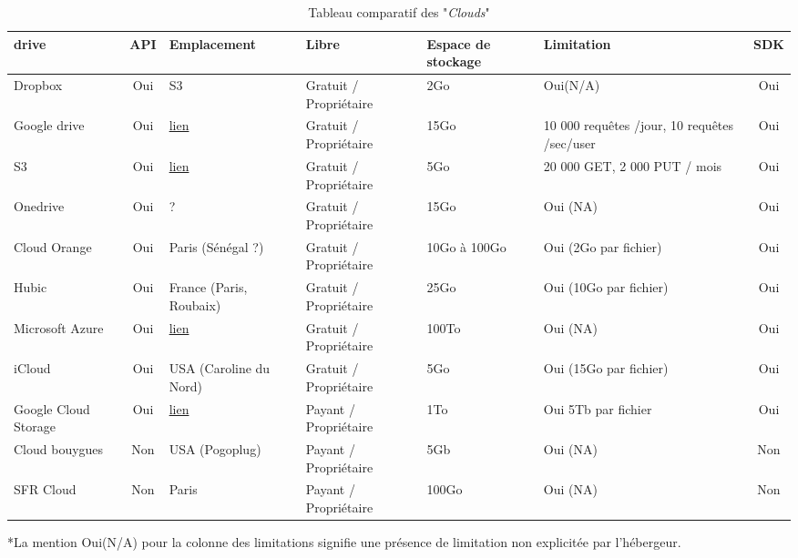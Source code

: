 \documentclass[10pt]{article}
\begin{document}
\begin{table}[!h] \caption{Tableau comparatif des "\textit{Clouds}"}
\renewcommand{\arraystretch}{1.5} \begin{center}
\begin{tabular}{|m{1in}|c|m{1in}|m{1in}|m{1in}|m{1in}|c|} \hline \bf\centering
drive & \bf API & \bf Emplacement & \bf Libre & \bf\centering Espace de stockage
& \bf Limitation & \bf SDK\\ \hline \centering Dropbox & Oui & S3 & Gratuit /
Propriétaire & 2Go & Oui(N/A) & Oui \\ \hline \centering Google drive & Oui  &
\href{http://www.google.com/about/datacenters/inside/locations/index.html}{lien}
& Gratuit / Propriétaire & 15Go & 10 000 requêtes /jour, 10 requêtes /sec/user &
Oui \\ \hline \centering S3 & Oui  &
\href{http://aws.amazon.com/fr/about-aws/global-infrastructure/}{lien} & Gratuit
/ Propriétaire & 5Go & 20 000 GET, 2 000 PUT / mois & Oui \\ \hline \centering
Onedrive & Oui  & ? & Gratuit / Propriétaire & 15Go & Oui (NA) & Oui \\ \hline
\centering Cloud Orange & Oui  & Paris (Sénégal ?) & Gratuit / Propriétaire &
10Go à 100Go & Oui (2Go par fichier) & Oui \\ \hline \centering Hubic & Oui  &
France (Paris, Roubaix) & Gratuit / Propriétaire & 25Go & Oui (10Go par fichier)
& Oui \\ \hline \centering Microsoft Azure & Oui  &
\href{http://azure.microsoft.com/en-us/regions/}{lien} & Gratuit / Propriétaire
& 100To & Oui (NA) & Oui \\ \hline \centering iCloud & Oui  & USA (Caroline du
Nord) & Gratuit / Propriétaire & 5Go & Oui (15Go par fichier) & Oui \\ \hline
\centering Google Cloud Storage & Oui  &
\href{http://www.google.com/about/datacenters/inside/locations/index.html}{lien}
& Payant  / Propriétaire & 1To & Oui 5Tb par fichier & Oui \\ \hline \centering
Cloud bouygues & Non  & USA (Pogoplug) & Payant  / Propriétaire & 5Gb & Oui (NA)
& Non \\ \hline \centering SFR Cloud & Non & Paris & Payant / Propriétaire &
100Go & Oui (NA) & Non \\ \hline \end{tabular} \end{center} \end{table} *La
mention Oui(N/A) pour la colonne des limitations signifie une présence de
limitation non explicitée par l'hébergeur.\\
\end{document}
